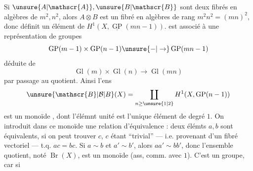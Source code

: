 Si $\unsure{A|\mathscr{A}},\unsure{B|\mathscr{B}}$ sont deux fibrés en algèbres de  $m^2,n^2$, alors $A\otimes B$ est un fibré en algèbres de rang $m^2n^2=(mn)^2$, donc définit un élément de $H^1(X,\underline{\operatorname{GP}}(mn-1))$.  est associé à une représentation de groupes
\[
\operatorname{GP}(m-1)\times\operatorname{GP}(n-1)\unsure{-|\to}\operatorname{GP}(mn-1)
\]
déduite de
\[
\operatorname{Gl}(m)\times\operatorname{Gl}(n)\longrightarrow\operatorname{Gl}(mn)
\]
par passage au quotient. Ainsi l'ens
\[
\unsure{\mathscr{B}|\mathcal{B}|B}(X)=\coprod_{n\geq\unsure{1|2}}H^1(X,\operatorname{GP}(n-1))
\]
est un monoïde , dont l'élémnt unité est l'unique élément de degré $1$. On  introduit dans ce monoïde une relation d'équivalence : deux  élémts $a,b$ sont équivalents, si on peut trouver $c$, $c$ étant ``trivial'' --- i.e. provenant d'un fibré vectoriel --- t.q. $ac=bc$. Si $a\sim b$ et $a'\sim b'$, alors $aa'\sim bb'$, donc l'ensemble quotient, noté $\operatorname{Br}(X)$, est un monoïde  (ass, comm. avec $1$). C'est  un groupe, car si
